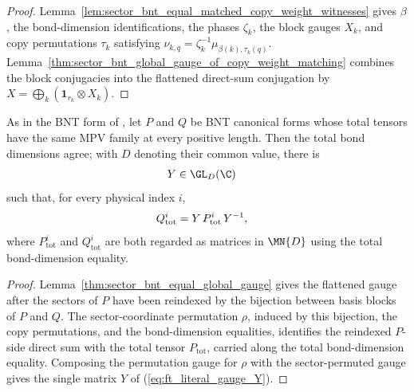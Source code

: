 \begin{proof}\leanok
    Lemma~\ref{lem:sector_bnt_equal_matched_copy_weight_witnesses} gives
    $\beta$, the bond-dimension identifications, the phases $\zeta_k$, the
    block gauges $X_k$, and copy permutations $\tau_k$ satisfying
    $\nu_{k,q}=\zeta_k^{-1}\mu_{\beta(k),\tau_k(q)}$.
    Lemma~\ref{thm:sector_bnt_global_gauge_of_copy_weight_matching} combines
    the block conjugacies into the flattened direct-sum conjugation by
    $X=\bigoplus_k(\mathbf{1}_{r_k}\otimes X_k)$.
\end{proof}

\begin{lemma}%
    \label{thm:sector_bnt_equal_mps_gaugeEquiv_literal}
    \leanok
    As in the BNT form of
    \cite[Corollary~2.11 and Appendix~A, lines~1189--1192]
    {Cirac2016MPDO_arXiv}, let $P$ and $Q$ be BNT canonical forms whose total
    tensors have the same MPV family at every positive length. Then the total
    bond dimensions agree; with $D$ denoting their common value, there is
    \begin{align}
        Y
         & \in \GL_D(\C)
        \label{eq:ft_literal_gauge_Y}
    \end{align}
    such that, for every physical index $i$,
    \begin{align}
        Q_{\mathrm{tot}}^i
         & = Y\,P_{\mathrm{tot}}^i\,Y^{-1},
        \notag
    \end{align}
    where $P_{\mathrm{tot}}^i$ and $Q_{\mathrm{tot}}^i$ are both regarded as
    matrices in $\MN{D}$ using the total bond-dimension equality.
\end{lemma}

\begin{proof}\leanok
    Lemma~\ref{thm:sector_bnt_equal_global_gauge} gives the
    flattened gauge after the sectors of $P$ have been reindexed by the
    bijection between basis blocks of $P$ and $Q$. The sector-coordinate
    permutation $\rho$, induced by this bijection, the copy permutations, and
    the bond-dimension equalities, identifies the reindexed $P$-side direct sum
    with the total tensor $P_{\mathrm{tot}}$, carried along the total
    bond-dimension equality. Composing the permutation gauge for $\rho$ with
    the sector-permuted gauge gives the single matrix $Y$ of
    (\ref{eq:ft_literal_gauge_Y}).
\end{proof}

